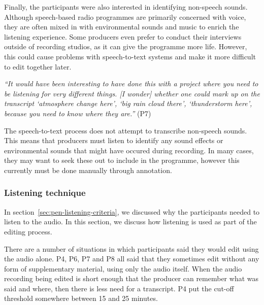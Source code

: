 

Finally, the participants were also interested in identifying non-speech sounds. Although speech-based radio programmes
are primarily concerned with voice, they are often mixed in with environmental sounds and music to enrich the listening
experience. Some producers even prefer to conduct their interviews outside of recording studios, as it can give the
programme more life. However, this could cause problems with speech-to-text systems and make it more difficult to edit
together later.


\textit{``It would have been interesting to have done this with a project where you need to be listening for very
  different things. [I wonder] whether one could mark up on the transcript `atmosphere change here', `big rain cloud
there', `thunderstorm here', because you need to know where they are.''} (P7)

The speech-to-text process does not attempt to transcribe non-speech sounds. This means that producers must listen to
identify any sound effects or environmental sounds that might have occured during recording. In many cases, they may
want to seek these out to include in the programme, however this currently must be done manually through annotation.

\subsubsection{Listening technique}

In section~\ref{sec:pen-listening-criteria}, we discussed why the participants needed to listen to the audio. In this
section, we discuss how listening is used as part of the editing process.


There are a number of situations in which participants said they would edit using the audio alone. P4, P6, P7 and P8
all said that they sometimes edit without any form of supplementary material, using only the audio itself. When
the audio recording being edited is short enough that the producer can remember what was said and where, then
there is less need for a transcript. P4 put the cut-off threshold somewhere between 15 and 25 minutes.

